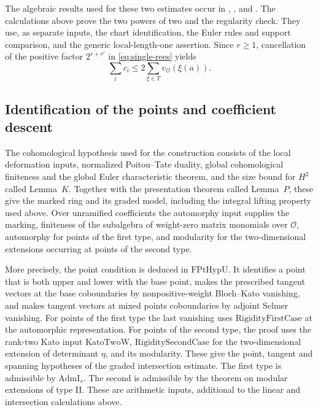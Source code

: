 The algebraic results used for these two estimates occur in
,
, and
. The calculations above prove
the two powers of two and the regularity check. They use, as separate
inputs, the chart identification, the Euler rules and support
comparison, and the generic local-length-one assertion. Since
\(r\ge1\), cancellation of the positive factor \(2^{r+r'}\) in
\eqref{eq:single-rees} yields
\[
               \sum_i c_i\le
                 2\sum_{\xi\in T}v_{\mathcal O}(\xi(a)).
\]

\subsection{Identification of the points and coefficient descent}

The cohomological hypothesis used for the construction consists of
the local deformation inputs, normalized Poitou--Tate duality, global
cohomological finiteness and the global Euler characteristic theorem,
and the size bound for \(H^2\) called Lemma~\(K\).
Together with the presentation theorem called Lemma~\(P\), these
give the marked ring and its graded model, including the integral
lifting property used above. Over unramified coefficients the
automorphy input supplies the marking, finiteness of the subalgebra
of weight-zero matrix monomials over \(\mathcal O\), automorphy for
points of the first type, and modularity for the two-dimensional
extensions occurring at points of the second type.

More precisely, the point condition is deduced in
\(\mathrm{FPtHypU}\). It identifies a point that is both upper and
lower with the base point, makes the prescribed tangent vectors at
the base coboundaries by nonpositive-weight Bloch--Kato vanishing,
and makes tangent vectors at mixed points coboundaries by adjoint
Selmer vanishing. For points of the first type the last vanishing
uses \(\mathrm{RigidityFirstCase}\) at the automorphic representation.
For points of the second type, the proof uses the rank-two Kato input
\(\mathrm{KatoTwoW}\), \(\mathrm{RigiditySecondCase}\) for the
two-dimensional extension of determinant \(\eta\), and its modularity.
These give the point, tangent and spanning hypotheses of the graded
intersection estimate. The first type is admissible by
\(\mathrm{AdmI}_s\). The second is admissible by the theorem on
modular extensions of type II. These are arithmetic inputs, additional
to the linear and intersection calculations above.

